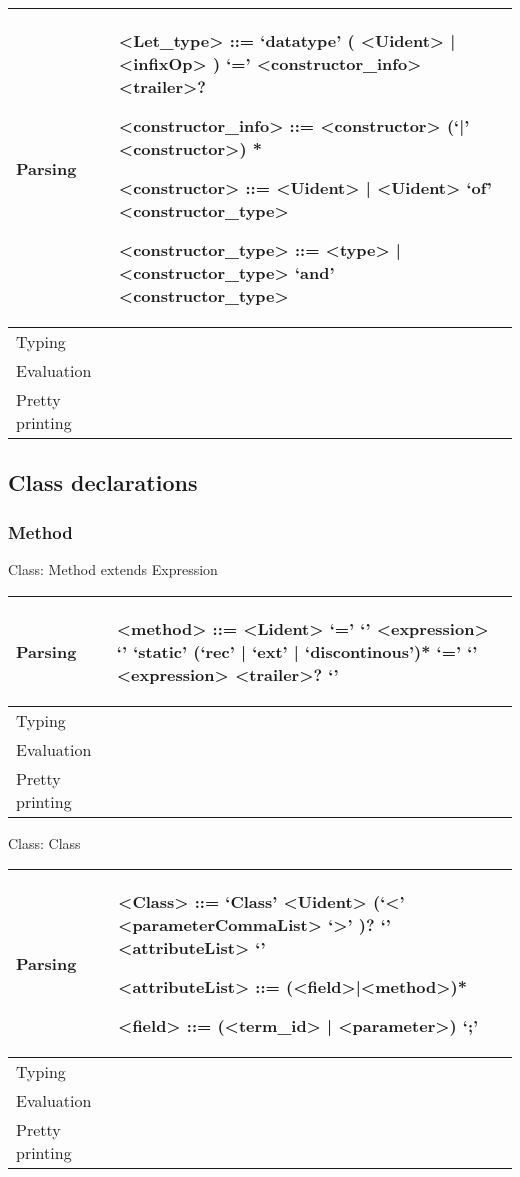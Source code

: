 \documentclass[12pt]{article}
\begin{document}
\begin{tabular}{|l|p{15cm}|}
\hline
Parsing & \begin{grammar}
<Let_type> ::= `datatype' ( <Uident> | <infixOp> ) `=' <constructor_info> <trailer>? 

<constructor_info> ::= <constructor> (`|' <constructor>) *

<constructor> ::= <Uident> | <Uident> `of' <constructor_type>

<constructor_type> ::= <type> | <constructor_type> `and' <constructor_type>
\end{grammar}  
   \\
\hline
Typing & 
\\
\hline
Evaluation  \\
\hline
Pretty printing &  \\
\hline
\end{tabular} 
\subsection{Class declarations}
\subsubsection{Method}
Class: Method extends Expression

\begin{tabular}{|l|p{15cm}|}
\hline
Parsing & \begin{grammar}
<method> ::= <Lident> `=' `{' <expression> `}'
\alt `static' (`rec' | `ext' | `discontinous')* `=' `{' <expression>  <trailer>? `}'

\end{grammar}  
   \\
\hline
Typing & 
\\
\hline
Evaluation &  \\
\hline
Pretty printing &  \\
\hline
\end{tabular} 

Class: Class

\begin{tabular}{|l|p{15cm}|}
\hline
Parsing & \begin{grammar}
<Class> ::= `Class' <Uident> (`<' <parameterCommaList> `>' )?  `{' <attributeList> `}'  

<attributeList> ::= (<field>|<method>)*

<field> ::= (<term_id> | <parameter>) `;'
\end{grammar}  
   \\
\hline
Typing & 
\\
\hline
Evaluation &  \\
\hline
Pretty printing &  \\
\hline
\end{tabular}
\end{document}
